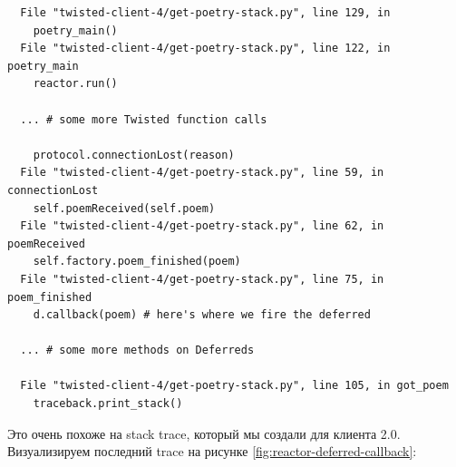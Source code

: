 \begin{scriptsize}\begin{verbatim}
  File "twisted-client-4/get-poetry-stack.py", line 129, in
    poetry_main()
  File "twisted-client-4/get-poetry-stack.py", line 122, in poetry_main
    reactor.run()

  ... # some more Twisted function calls

    protocol.connectionLost(reason)
  File "twisted-client-4/get-poetry-stack.py", line 59, in connectionLost
    self.poemReceived(self.poem)
  File "twisted-client-4/get-poetry-stack.py", line 62, in poemReceived
    self.factory.poem_finished(poem)
  File "twisted-client-4/get-poetry-stack.py", line 75, in poem_finished
    d.callback(poem) # here's where we fire the deferred

  ... # some more methods on Deferreds

  File "twisted-client-4/get-poetry-stack.py", line 105, in got_poem
    traceback.print_stack()
\end{verbatim}\end{scriptsize}

Это очень похоже на stack trace, который мы создали для клиента 2.0. 
Визуализируем последний trace на рисунке \ref{fig:reactor-deferred-callback}:


